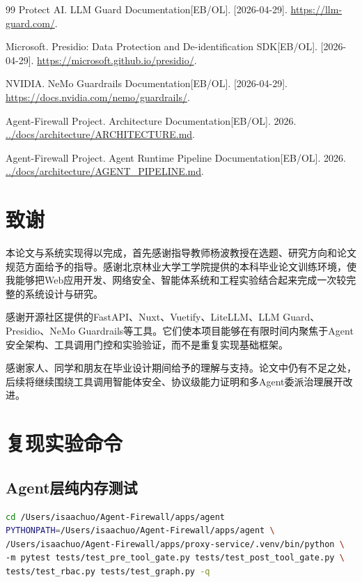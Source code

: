 \documentclass[UTF8,zihao=-4,scheme=chinese,fontset=none]{ctexart}
\begin{document}
\begin{thebibliography}{99}
 Protect AI. LLM Guard Documentation[EB/OL]. [2026-04-29]. \url{https://llm-guard.com/}.

 Microsoft. Presidio: Data Protection and De-identification SDK[EB/OL]. [2026-04-29]. \url{https://microsoft.github.io/presidio/}.

 NVIDIA. NeMo Guardrails Documentation[EB/OL]. [2026-04-29]. \url{https://docs.nvidia.com/nemo/guardrails/}.

 Agent-Firewall Project. Architecture Documentation[EB/OL]. 2026. \url{../docs/architecture/ARCHITECTURE.md}.

 Agent-Firewall Project. Agent Runtime Pipeline Documentation[EB/OL]. 2026. \url{../docs/architecture/AGENT_PIPELINE.md}.

\end{thebibliography}

\clearpage
\section*{致谢}

本论文与系统实现得以完成，首先感谢指导教师杨波教授在选题、研究方向和论文规范方面给予的指导。感谢北京林业大学工学院提供的本科毕业论文训练环境，使我能够把Web应用开发、网络安全、智能体系统和工程实验结合起来完成一次较完整的系统设计与研究。

感谢开源社区提供的FastAPI、Nuxt、Vuetify、LiteLLM、LLM Guard、Presidio、NeMo Guardrails等工具。它们使本项目能够在有限时间内聚焦于Agent安全架构、工具调用门控和实验验证，而不是重复实现基础框架。

感谢家人、同学和朋友在毕业设计期间给予的理解与支持。论文中仍有不足之处，后续将继续围绕工具调用智能体安全、协议级能力证明和多Agent委派治理展开改进。

\clearpage
\appendix
\section{复现实验命令}

\subsection{Agent层纯内存测试}

\begin{lstlisting}[language=bash]
cd /Users/isaachuo/Agent-Firewall/apps/agent
PYTHONPATH=/Users/isaachuo/Agent-Firewall/apps/agent \
/Users/isaachuo/Agent-Firewall/apps/proxy-service/.venv/bin/python \
-m pytest tests/test_pre_tool_gate.py tests/test_post_tool_gate.py \
tests/test_rbac.py tests/test_graph.py -q
\end{lstlisting}
\end{document}

